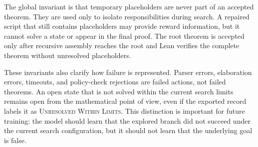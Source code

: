 The global invariant is that temporary placeholders are never part of an accepted theorem. They are used only to isolate responsibilities during search. A repaired script that still contains placeholders may provide reward information, but it cannot solve a state or appear in the final proof. The root theorem is accepted only after recursive assembly reaches the root and Lean verifies the complete theorem without unresolved placeholders.

These invariants also clarify how failure is represented. Parser errors, elaboration errors, timeouts, and policy-check rejections are failed actions, not failed theorems. An open state that is not solved within the current search limits remains open from the mathematical point of view, even if the exported record labels it as \textsc{Unresolved Within Limits}. This distinction is important for future training: the model should learn that the explored branch did not succeed under the current search configuration, but it should not learn that the underlying goal is false.
